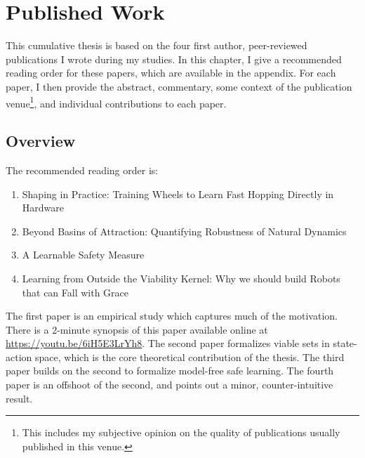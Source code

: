 
\chapter{Published Work} \label{chap:pubs}
This cumulative thesis is based on the four first author, peer-reviewed publications I wrote during my studies. In this chapter, I give a recommended reading order for these papers, which are available in the appendix. For each paper, I then provide the abstract, commentary, some context of the publication venue\footnote{This includes my subjective opinion on the quality of publications usually published in this venue.}, and individual contributions to each paper.

\section{Overview}
The recommended reading order is:
\begin{enumerate}
    \item Shaping in Practice: Training Wheels to Learn Fast Hopping Directly in Hardware
    \item Beyond Basins of Attraction: Quantifying Robustness of Natural Dynamics
    \item A Learnable Safety Measure
    \item Learning from Outside the Viability Kernel: Why we should build Robots that can Fall with Grace
\end{enumerate}
The first paper is an empirical study which captures much of the motivation. There is a 2-minute synopsis of this paper available online at \url{https://youtu.be/6iH5E3LrYh8}. The second paper formalizes viable sets in state-action space, which is the core theoretical contribution of the thesis. The third paper builds on the second to formalize model-free safe learning. The fourth paper is an offshoot of the second, and points out a minor, counter-intuitive result.

